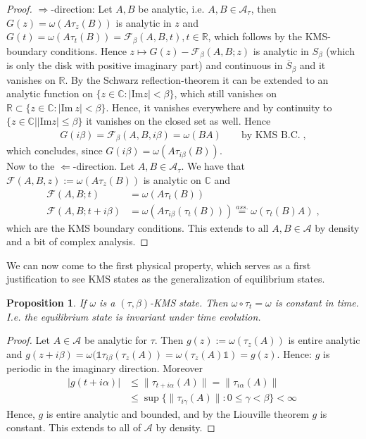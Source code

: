 \documentclass[
a4paper, %
11pt, %
onecolumn, %
openany, %
]{memoir}
\theoremstyle{definition}
\theoremstyle{remark}
\theoremstyle{plain}
\newtheorem{prop}[definition]{Proposition}
\begin{document}
\begin{proof}
	$\Rightarrow$-direction: Let $A,B$ be analytic, i.e. $A,B\in\mathcal{A}_{\tau}$, then  $G(z)=\omega(A\tau_z(B))$ is analytic in $z$ and $G(t)=\omega(A\tau_t(B))=\mathcal{F}_{\beta}(A,B,t),t\in\mathbb{R}$, which follows by the KMS-boundary conditions. Hence $z\mapsto G(z)-\mathcal{F}_{\beta}(A,B;z)$ is analytic in $S_{\beta}$ (which is only the disk with positive imaginary part) and continuous in $\overline{S}_{\beta}$ and it vanishes on $\mathbb{R}$. By the Schwarz reflection-theorem it can be extended to an analytic function on $\{z\in\mathbb{C}:|\mathrm{Im}z|<\beta\}$, which still vanishes on $\mathbb{R}\subset \{z\in\mathbb{C}:|\mathrm{Im}~z|<\beta\}$. Hence, it vanishes everywhere and by continuity to $\{z\in\mathbb{C}||\mathrm{Im}z|\leq \beta\}$ it vanishes on the closed set as well. Hence \begin{align}
	G(i\beta)=\mathcal{F}_{\beta}(A,B,i\beta)=\omega(BA) \qquad \text{by KMS B.C.}\;,
	\end{align}
	which concludes, since $G(i\beta)=\omega(A\tau_{i\beta}(B))$.\\Now to the $\Leftarrow$-direction. Let $A,B\in\mathcal{A}_{\tau}$. We have that $\mathcal{F}(A,B,z):=\omega(A\tau_z(B))$ is analytic on $\mathbb{C}$ and \begin{align}
	\mathcal{F}(A,B;t)&=\omega(A\tau_t(B))\\
	\mathcal{F}(A,B;t+i\beta)&=\omega(A\tau_{i\beta}(\tau_t(B)))\overset{ass.}{=}\omega(\tau_t(B)A)\; ,
	\end{align}
which are the KMS boundary conditions. This extends to all $A,B\in\mathcal{A}$ by density and a bit of complex analysis.\end{proof}
We can now come to the first physical property, which serves as a first justification to see KMS states as the generalization of equilibrium states. \begin{prop}
	If $\omega$ is a $(\tau,\beta)$-KMS state. Then $\omega\circ \tau_t=\omega$ is constant in time. I.e. the equilibrium state is invariant under time evolution.
\end{prop}
\begin{proof}
	Let $A\in\mathcal{A}$ be analytic for $\tau$. Then $g(z):=\omega(\tau_z(A))$ is entire analytic and $g(z+i\beta)=\omega(\mathds{1}\tau_{i\beta}(\tau_z(A))=\omega(\tau_z(A)\mathds{1})=g(z)$. Hence: $g$ is periodic in the imaginary direction. Moreover \begin{align}
	|g(t+i\alpha)|&\leq \|\tau_{t+i\alpha}(A)\|=\|\tau_{i\alpha}(A)\| \\
	&\leq \sup\{\|\tau_{i\gamma}(A)\|:0\leq \gamma <\beta\} < \infty\; 
	\end{align}
	Hence, $g$ is entire analytic and bounded, and by the Liouville theorem $g$ is constant. This extends to all of $\mathcal{A}$ by density.
\end{proof}
\end{document}
